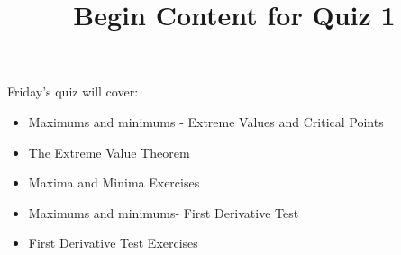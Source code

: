 \documentclass{ximera}
\title{Begin Content for Quiz 1}
\begin{document}
\begin{abstract}
\end{abstract}

\maketitle

\begin{sectionOutcomes}

Friday's quiz will cover:

\begin{itemize}
	\item Maximums and minimums - Extreme Values and Critical Points
	\item The Extreme Value Theorem
   	\item Maxima and Minima Exercises
    \item Maximums and minimums- First Derivative Test
	\item First Derivative Test Exercises
\end{itemize}

\end{sectionOutcomes}
\end{document}
